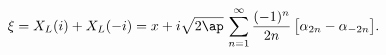 \begin{equation}
\xi=X_L(i)+X_L(-i)=x+i\sqrt{2\ap}\,\sum_{n=1}^{\infty}
\frac{(-1)^n}{2n}\,\bigl[\alpha_{2n}-\alpha_{-2n}\bigr].
\end{equation}

